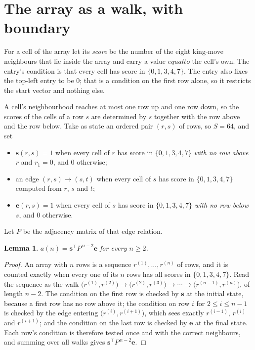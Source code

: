 \documentclass[11pt,a4paper]{article}
\theoremstyle{plain}
\newtheorem{lemma}[theorem]{Lemma}
\theoremstyle{definition}
\begin{document}
\section{The array as a walk, with boundary}

For a cell of the array let its \emph{score} be the number of the eight king-move neighbours that lie inside
the array and carry a value $equal to$ the cell's own. The entry's condition is that every cell
has score in $\{0,1,3,4,7\}$. The entry also fixes the top-left entry to be $0$; that is a condition on the first row alone, so it restricts the start vector and nothing else.

A cell's neighbourhood reaches at most one row up and one row down, so the scores of the
cells of a row $s$ are determined by $s$ together with the row above and the row below.
Take as state an ordered pair $(r,s)$ of rows, so $S=64$, and set
\begin{itemize}
\item $\mathbf{s}(r,s)=1$ when every cell of $r$ has score in $\{0,1,3,4,7\}$ \emph{with no row
above $r$} and $r_1=0$, and $0$ otherwise;
\item an edge $(r,s)\to(s,t)$ when every cell of $s$ has score in $\{0,1,3,4,7\}$ computed from
$r$, $s$ and $t$;
\item $\mathbf{e}(r,s)=1$ when every cell of $s$ has score in $\{0,1,3,4,7\}$ \emph{with no row
below $s$}, and $0$ otherwise.
\end{itemize}
Let $P$ be the adjacency matrix of that edge relation.

\begin{lemma}\label{lem:walk}
$a(n)=\mathbf{s}^{\!\top}P^{\,n-2}\mathbf{e}$ for every $n\ge2$.
\end{lemma}

\begin{proof}
An array with $n$ rows is a sequence $r^{(1)},\dots,r^{(n)}$ of rows, and it is counted
exactly when every one of its $n$ rows has all scores in $\{0,1,3,4,7\}$. Read the sequence as the
walk $\bigl(r^{(1)},r^{(2)}\bigr)\to\bigl(r^{(2)},r^{(3)}\bigr)\to\cdots\to
\bigl(r^{(n-1)},r^{(n)}\bigr)$, of length $n-2$. The condition on the first row is
checked by $\mathbf{s}$ at the initial state, because a first row has no row above it; the
condition on row $i$ for $2\le i\le n-1$ is checked by the edge entering
$\bigl(r^{(i)},r^{(i+1)}\bigr)$, which sees exactly $r^{(i-1)}$, $r^{(i)}$ and
$r^{(i+1)}$; and the condition on the last row is checked by $\mathbf{e}$ at the final
state. Each row's condition is therefore tested once and with the correct neighbours, and
summing over all walks gives $\mathbf{s}^{\!\top}P^{\,n-2}\mathbf{e}$.
\end{proof}
\end{document}
